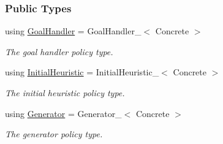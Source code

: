 \subsubsection*{Public Types}
\begin{DoxyCompactItemize}
\item 
using \hyperlink{structslb_1_1ext_1_1algorithm_1_1Algorithm_ae0c6a75028107e4642e43798f21f4bfc}{Goal\+Handler} = Goal\+Handler\+\_\+$<$ Concrete $>$\hypertarget{structslb_1_1ext_1_1algorithm_1_1Algorithm_ae0c6a75028107e4642e43798f21f4bfc}{}\label{structslb_1_1ext_1_1algorithm_1_1Algorithm_ae0c6a75028107e4642e43798f21f4bfc}

\begin{DoxyCompactList}\small\item\em The goal handler policy type. \end{DoxyCompactList}\item 
using \hyperlink{structslb_1_1ext_1_1algorithm_1_1Algorithm_ad1f8f28e7b07f747ef7b7b5bf0643c2d}{Initial\+Heuristic} = Initial\+Heuristic\+\_\+$<$ Concrete $>$\hypertarget{structslb_1_1ext_1_1algorithm_1_1Algorithm_ad1f8f28e7b07f747ef7b7b5bf0643c2d}{}\label{structslb_1_1ext_1_1algorithm_1_1Algorithm_ad1f8f28e7b07f747ef7b7b5bf0643c2d}

\begin{DoxyCompactList}\small\item\em The initial heuristic policy type. \end{DoxyCompactList}\item 
using \hyperlink{structslb_1_1ext_1_1algorithm_1_1Algorithm_afa5a78c048b4fe4f5848aeaf5c1f8d65}{Generator} = Generator\+\_\+$<$ Concrete $>$\hypertarget{structslb_1_1ext_1_1algorithm_1_1Algorithm_afa5a78c048b4fe4f5848aeaf5c1f8d65}{}\label{structslb_1_1ext_1_1algorithm_1_1Algorithm_afa5a78c048b4fe4f5848aeaf5c1f8d65}

\begin{DoxyCompactList}\small\item\em The generator policy type. \end{DoxyCompactList}\end{DoxyCompactItemize}
